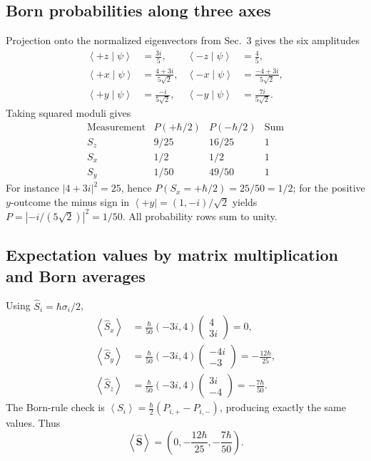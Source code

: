 \documentclass[11pt,a4paper]{article}
\theoremstyle{definition}
\newcommand{\bra}[1]{\left\langle#1\right|}
\newcommand{\avg}[1]{\left\langle #1\right\rangle}
\newcommand{\ip}[2]{\left\langle#1\middle|#2\right\rangle}
\begin{document}
\subsection{Born probabilities along three axes}
Projection onto the normalized eigenvectors from Sec.~3 gives the six amplitudes
\begin{align}
\ip{+z}\psi&=\frac{3i}{5}, & \ip{-z}\psi&=\frac45,\\
\ip{+x}\psi&=\frac{4+3i}{5\sqrt2},& \ip{-x}\psi&=\frac{-4+3i}{5\sqrt2},\\
\ip{+y}\psi&=\frac{-i}{5\sqrt2},& \ip{-y}\psi&=\frac{7i}{5\sqrt2}.
\end{align}
Taking squared moduli gives
\begin{equation}
\boxed{\begin{array}{c|cc|c}
\text{Measurement}&P(+\hbar/2)&P(-\hbar/2)&\text{Sum}\\\hline
S_z&9/25&16/25&1\\ S_x&1/2&1/2&1\\ S_y&1/50&49/50&1
\end{array}}
\label{eq:probtable}
\end{equation}
For instance \(|4+3i|^2=25\), hence \(P(S_x=+\hbar/2)=25/50=1/2\); for the positive \(y\)-outcome the minus sign in \(\bra{+y}=(1,-i)/\sqrt2\) yields \(P=|-i/(5\sqrt2)|^2=1/50\). All probability rows sum to unity.
\subsection{Expectation values by matrix multiplication and Born averages}
Using \(\hat S_i=\hbar\sigma_i/2\),
\begin{align}
\avg{\hat S_x}&=\frac{\hbar}{50}(-3i,4)\begin{pmatrix}4\\3i\end{pmatrix}=0,\\
\avg{\hat S_y}&=\frac{\hbar}{50}(-3i,4)\begin{pmatrix}-4i\\-3\end{pmatrix}=-\frac{12\hbar}{25},\\
\avg{\hat S_z}&=\frac{\hbar}{50}(-3i,4)\begin{pmatrix}3i\\-4\end{pmatrix}=-\frac{7\hbar}{50}.
\end{align}
The Born-rule check is \(\avg{S_i}=\frac\hbar2(P_{i,+}-P_{i,-})\), producing exactly the same values. Thus
\begin{equation}
\boxed{\avg{\hat{\mathbf S}}=\left(0,-\frac{12\hbar}{25},-\frac{7\hbar}{50}\right).}
\end{equation}
\end{document}
